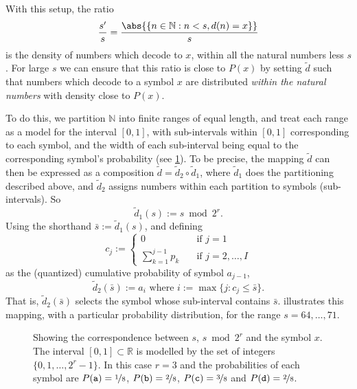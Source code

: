 \documentclass{article}
\theoremstyle{definition}
\begin{document}
With this setup, the ratio
\begin{equation}\label{eq:ratio}
  \frac{s'}{s} = \frac{\abs{\{n\in\mathbb{N}: n < s, d(n) = x\}}}{s}
\end{equation}
is the density of numbers which decode to \(x\), within all the natural numbers
less \(s\). For large \(s\) we can ensure that this ratio is close to \(P(x)\)
by setting \(\tilde d\) such that numbers which decode to a symbol \(x\) are
distributed \emph{within the natural numbers} with density close to \(P(x)\).

To do this, we partition \(\mathbb{N}\) into finite ranges of equal length, and
treat each range as a model for the interval \([0, 1]\), with sub-intervals
within \([0, 1]\) corresponding to each symbol, and the width of each
sub-interval being equal to the corresponding symbol's probability (see
\cref{fig:interval}). To be precise, the mapping \(\tilde d\) can then be
expressed as a composition \(\tilde d = \tilde d_2 \circ \tilde d_1\), where
\(\tilde d_1\) does the partitioning described above, and \(\tilde d_2\)
assigns numbers within each partition to symbols (sub-intervals). So
\begin{equation}
  \tilde d_1(s) := s \bmod 2^{r}.
\end{equation}
Using the shorthand \(\bar{s} := \tilde d_1 (s)\), and defining
\begin{equation}
  c_j := \begin{cases}
    0                    &\quad\text{if }j=1\\
    \sum_{k=1}^{j-1} p_k &\quad\text{if }j=2,\ldots,I
  \end{cases}
\end{equation}
as the (quantized) cumulative probability of symbol \(a_{j-1}\),
\begin{equation}
  \tilde d_2(\bar s) := a_i\text{ where }i := \max \{j : c_j \leq \bar s\}.
\end{equation}
That is, \(\tilde d_2(\bar s)\) selects the symbol whose sub-interval contains
\(\bar s\).   illustrates this mapping, with a particular
probability distribution, for the range \(s = 64,\ldots, 71\).

\begin{figure}[ht]
  \centering
  \drawinterval
  \caption{
    Showing the correspondence between \(s\), \(s \bmod 2^{r}\) and the
    symbol \(x\). The interval \([0, 1]\subset\mathbb{R}\) is modelled by the
    set of integers \(\{0, 1, \ldots, 2^{r} - 1\}\). In this case \(r = 3\)
    and the probabilities of each symbol are \(P(\mathtt a) =
    \nicefrac{1}{8}\), \(P(\mathtt b) = \nicefrac{2}{8}\), \(P(\mathtt c) =
    \nicefrac{3}{8}\) and \(P(\mathtt d) = \nicefrac{2}{8}\).}
  \label{fig:interval}
\end{figure}
\end{document}
